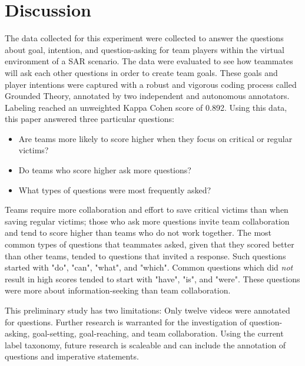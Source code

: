 \section{Discussion}

The data collected for this experiment were collected to answer the questions about goal, intention, and question-asking for team players within the virtual environment of a SAR scenario. The data were evaluated to see how teammates will ask each other questions in order to create team goals. These goals and player intentions were captured with a robust and vigorous coding process called Grounded Theory, annotated by two independent and autonomous annotators. Labeling reached an unweighted Kappa Cohen score of 0.892. Using this data, this paper answered three particular questions:
\begin{itemize}
    \item Are teams more likely to score higher when they focus on critical or regular victims?
    \item Do teams who score higher ask more questions?
    \item What types of questions were most frequently asked?
 \end{itemize}

Teams require more collaboration and effort to save critical victims than when saving regular victims; those who ask more questions invite team collaboration and tend to score higher than teams who do not work together. The most common types of questions that teammates asked, given that they scored better than other teams, tended to questions that invited a response. Such questions started with "do", "can", "what", and "which". Common questions which did \textit{not} result in high scores tended to start with "have", "is", and "were". These questions were more about information-seeking than team collaboration.
 
This preliminary study has two limitations: Only twelve videos were annotated for questions. Further research is warranted for the investigation of question-asking, goal-setting, goal-reaching, and team collaboration. Using the current label taxonomy, future research is scaleable and can include the annotation of questions and imperative statements. 



